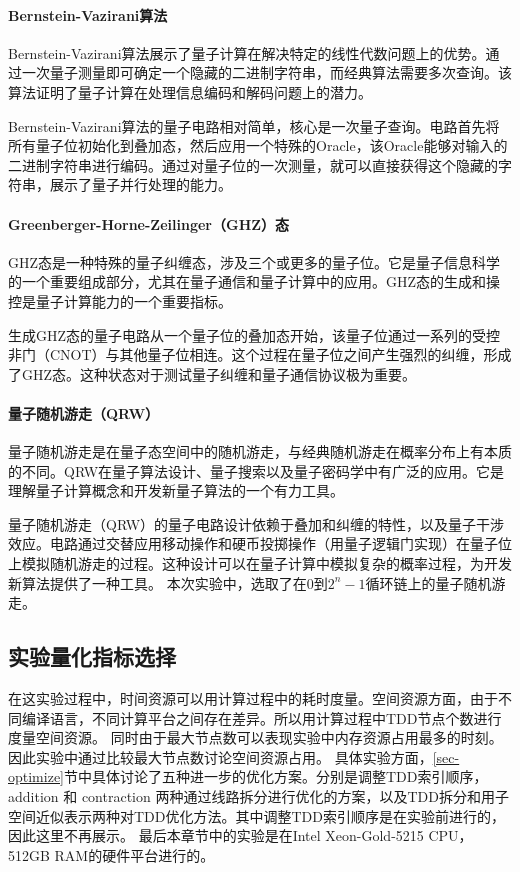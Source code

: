 \paragraph{Bernstein-Vazirani算法}
Bernstein-Vazirani算法展示了量子计算在解决特定的线性代数问题上的优势。通过一次量子测量即可确定一个隐藏的二进制字符串，而经典算法需要多次查询。该算法证明了量子计算在处理信息编码和解码问题上的潜力。

Bernstein-Vazirani算法的量子电路相对简单，核心是一次量子查询。电路首先将所有量子位初始化到叠加态，然后应用一个特殊的Oracle，该Oracle能够对输入的二进制字符串进行编码。通过对量子位的一次测量，就可以直接获得这个隐藏的字符串，展示了量子并行处理的能力。

\paragraph{Greenberger-Horne-Zeilinger（GHZ）态}
GHZ态是一种特殊的量子纠缠态，涉及三个或更多的量子位。它是量子信息科学的一个重要组成部分，尤其在量子通信和量子计算中的应用。GHZ态的生成和操控是量子计算能力的一个重要指标。

生成GHZ态的量子电路从一个量子位的叠加态开始，该量子位通过一系列的受控非门（CNOT）与其他量子位相连。这个过程在量子位之间产生强烈的纠缠，形成了GHZ态。这种状态对于测试量子纠缠和量子通信协议极为重要。

\paragraph{量子随机游走（QRW）}
量子随机游走是在量子态空间中的随机游走，与经典随机游走在概率分布上有本质的不同。QRW在量子算法设计、量子搜索以及量子密码学中有广泛的应用。它是理解量子计算概念和开发新量子算法的一个有力工具。

量子随机游走（QRW）的量子电路设计依赖于叠加和纠缠的特性，以及量子干涉效应。电路通过交替应用移动操作和硬币投掷操作（用量子逻辑门实现）在量子位上模拟随机游走的过程。这种设计可以在量子计算中模拟复杂的概率过程，为开发新算法提供了一种工具。
本次实验中，选取了在$0$到$2^n-1$循环链上的量子随机游走。

\subsection*{实验量化指标选择}
在这实验过程中，时间资源可以用计算过程中的耗时度量。空间资源方面，由于不同编译语言，不同计算平台之间存在差异。所以用计算过程中TDD节点个数进行度量空间资源。
同时由于最大节点数可以表现实验中内存资源占用最多的时刻。因此实验中通过比较最大节点数讨论空间资源占用。
具体实验方面，\ref{sec-optimize}节中具体讨论了五种进一步的优化方案。分别是调整TDD索引顺序，addition 和 contraction 两种通过线路拆分进行优化的方案，以及TDD拆分和用子空间近似表示两种对TDD优化方法。其中调整TDD索引顺序是在实验前进行的，因此这里不再展示。 
最后本章节中的实验是在Intel Xeon-Gold-5215 CPU，512GB RAM的硬件平台进行的。
